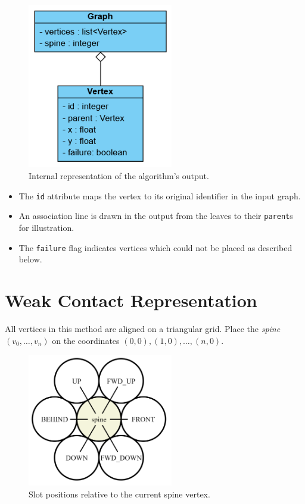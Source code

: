 \documentclass[draft,final]{vutinfth} %
\begin{document}
\begin{figure}
    \centering
    \includegraphics[width=180pt]{graphics/output_repr.png}
    \caption{Internal representation of the algorithm's output.}
    \label{fig:output_repr}
\end{figure}

\begin{itemize}
    \item The \texttt{id} attribute maps the vertex to its original identifier in the input graph.
    \item An association line is drawn in the output from the leaves to their \texttt{parent}s for illustration.
    \item The \texttt{failure} flag indicates vertices which could not be placed as described below.
\end{itemize}

\section{Weak Contact Representation}

All vertices in this method are aligned on a triangular grid.
Place the \emph{spine} $(v_0, \ldots , v_n)$ on the coordinates $(0,0), (1,0), \ldots , (n,0)$.

\begin{figure}
    \centering
    \includegraphics[width=180pt]{graphics/slots.png}
    \caption{Slot positions relative to the current spine vertex.}
    \label{fig:slots}
\end{figure}
\end{document}
